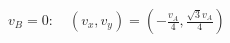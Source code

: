\documentclass[border=2.5pt]{standalone}
\begin{document}
$\displaystyle v_B=0:\quad (v_x,v_y)=\left(-\frac{v_A}4,\frac{\sqrt3v_A}4\right)$
\end{document}
